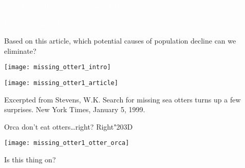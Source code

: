 \documentclass[t]{beamer}
\begin{document}
%
{
\begin{frame}{\phantom{phantom}}
	\begin{multicols}{2}
	
		\hangpara\textcolor{white}{Four factors that determine population size.}
	
	\columnbreak
	
		\hangpara\textcolor{white}{Possible causes of decline.}
	
	\end{multicols}
\end{frame}
}
%
\begin{frame}[t]
	\begin{multicols}{2}
	
		Based on this article, which potential causes 
		of population decline can we eliminate?
		
		\vspace*{0.65\baselineskip}
		
		\texttt{[image: missing\_otter1\_intro]}

	\columnbreak
	
		\texttt{[image: missing\_otter1\_article]}

	\end{multicols}
	
	\vfilll
	
	\tiny Excerpted from Stevens, W.K. Search for missing sea otters turns up a few surprises. New York Times, January 5, 1999.

\end{frame}
%
\begin{frame}[t]{Orca don't eat otters\dots right? \hfill Right\char"203D}

	\texttt{[image: missing\_otter1\_otter\_orca]}

	\vfilll
	
	\hfill \tiny Is this thing on?
\end{frame}
%
\end{document}
